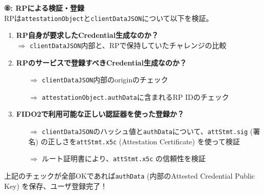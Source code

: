 \documentclass[12pt,dvipdfmx,uplatex]{beamer}
\begin{document}
\begin{frame}
\small
\textbf{⑧: RPによる検証・登録}\\[2ex]

RPは\texttt{attestationObject}と\texttt{clientDataJSON}について以下を検証。

\begin{enumerate}
 \item \textbf{RP自身が要求したCredential生成なのか？}\\
$\Rightarrow$ \texttt{clientDataJSON}内部と、RPで保持していたチャレンジの比較
 \item \textbf{RPのサービスで登録すべきCredential生成なのか？}\\
\begin{itemize}
 \item[$\Rightarrow$] \texttt{clientDataJSON}内部のoriginのチェック
 \item[$\Rightarrow$] \texttt{attestationObject.authData}に含まれるRP IDのチェック
\end{itemize}
 \item \textbf{FIDO2で利用可能な正しい認証器を使った登録か？}\\
\begin{itemize}
 \item[$\Rightarrow$] \alert{\texttt{clientDataJSON}のハッシュ値と\texttt{authData}について、\texttt{attStmt.sig} (署名) の正しさを\texttt{attStmt.x5c} (Attestation Certificate) を使って検証}
 \item[$\Rightarrow$] \alert{ルート証明書により、\texttt{attStmt.x5c} の信頼性を検証}
\end{itemize}

\end{enumerate}
上記のチェックが全部OKであれば\texttt{authData} (内部のAttested Credential Public Key) を保存、ユーザ登録完了！
\end{frame}
\end{document}

